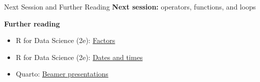 \documentclass[
  ignorenonframetext,
  aspectratio=169,
]{beamer}
\providecommand{\tightlist}{%
  \setlength{\itemsep}{0pt}\setlength{\parskip}{0pt}}\usepackage{longtable,booktabs,array}
\begin{document}
\begin{frame}{Next Session and Further Reading}
\protect\hypertarget{next-session-and-further-reading}{}
\textbf{Next session:} operators, functions, and loops

\textbf{Further reading}

\begin{itemize}
\tightlist
\item
  R for Data Science (2e):
  \href{https://r4ds.hadley.nz/factors.html}{Factors}
\item
  R for Data Science (2e):
  \href{https://r4ds.hadley.nz/datetimes.html}{Dates and times}
\item
  Quarto:
  \href{https://quarto.org/docs/presentations/beamer.html}{Beamer
  presentations}
\end{itemize}
\end{frame}
\end{document}
